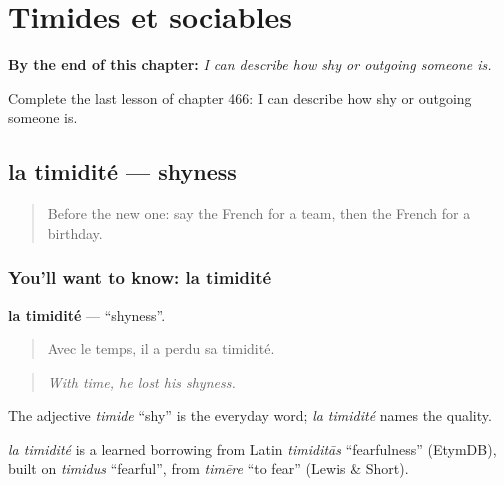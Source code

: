 
\chapter{Timides et sociables}
\label{ch:fr-timides-et-sociables}

\begin{chapteropening}
\textbf{By the end of this chapter:} \emph{I can describe how shy or outgoing someone is.}

Complete the last lesson of chapter 466: I can describe how shy or outgoing someone is.
\end{chapteropening}

\section[la timidité]{la timidité — shyness}

\label{lesson:FR-C466-timidite}



\begin{quote}
Before the new one: say the French for a team, then the French for a birthday.
\end{quote}

\subsection*{You'll want to know: la timidité}
\textbf{la timidité} — \textquotedblleft{}shyness\textquotedblright{}.

\begin{quote}
Avec le temps, il a perdu sa timidité.
\end{quote}

\begin{quote}
\emph{With time, he lost his shyness.}
\end{quote}

The adjective \emph{timide} \textquotedblleft{}shy\textquotedblright{} is the everyday word; \emph{la timidité} names the quality.

\begin{cousinweb}
\emph{la timidité} is a learned borrowing from Latin \emph{timiditās} \textquotedblleft{}fearfulness\textquotedblright{} (EtymDB), built on \emph{timidus} \textquotedblleft{}fearful\textquotedblright{}, from \emph{timēre} \textquotedblleft{}to fear\textquotedblright{} (Lewis \& Short).
\end{cousinweb}

